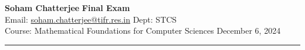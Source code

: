 \documentclass[a4paper, 11pt]{article}
\begin{document}
	
	
	{\noindent \large\textbf{Soham Chatterjee} \hfill \textbf{Final Exam}\\
		Email: \href{soham.chatterjee@tifr.res.in}{soham.chatterjee@tifr.res.in} \hfill Dept: STCS\\
		\normalsize Course: Mathematical Foundations for Computer Sciences \hfill December 6, 2024\\ 
		\noindent\rule{7in}{2.8pt}}
	
	
\end{document}

